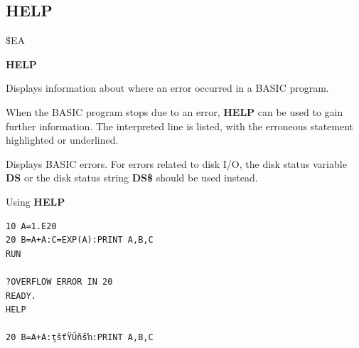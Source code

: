 
\newpage
\subsection{HELP}
\begin{description}[leftmargin=2cm,style=nextline]
\item [Token:] \$EA
\item [Format:] {\bf HELP}
\item [Usage:]
   Displays information about where an error occurred in a BASIC program.

   When the BASIC program stops due to an error,
   {\bf HELP} can be used to gain further information.
   The interpreted line is listed, with the
   erroneous statement highlighted or underlined.

\item [Remarks:]
      Displays BASIC errors. For errors related to disk
      I/O, the disk status variable {\bf DS}
      or the disk status string {\bf DS\$} should be used instead.

\item [Example:] Using {\bf HELP}
\begin{tcolorbox}[colback=black,coltext=white]
\verbatimfont{\codefont}
\begin{verbatim}
10 A=1.E20
20 B=A+A:C=EXP(A):PRINT A,B,C
RUN

?OVERFLOW ERROR IN 20
READY.
HELP

20 B=A+A:ţŝťŸŰňšŉ:PRINT A,B,C
\end{verbatim}
\end{tcolorbox}
\end{description}


\newpage
